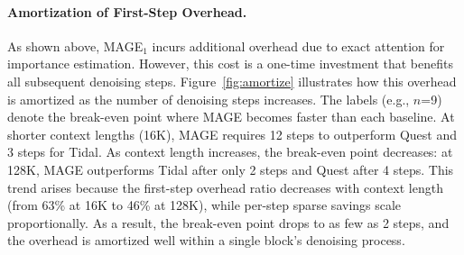 \paragraph{Amortization of First-Step Overhead.}
As shown above, MAGE$_1$ incurs additional overhead due to 
exact attention for importance estimation. However, this 
cost is a one-time investment that benefits all subsequent 
denoising steps. Figure~\ref{fig:amortize} illustrates how 
this overhead is amortized as the number of denoising steps 
increases. The labels (e.g., $n$=9) denote the break-even 
point where MAGE becomes faster than each baseline. At 
shorter context lengths (16K), MAGE requires 12 steps to 
outperform Quest and 3 steps for Tidal. As context length 
increases, the break-even point decreases: at 128K, MAGE 
outperforms Tidal after only 2 steps and Quest after 4 steps. 
This trend arises because the first-step overhead ratio 
decreases with context length (from 63\% at 16K to 46\% 
at 128K), while per-step sparse savings scale proportionally. 
As a result, the break-even point drops to as few as 2 steps, 
and the overhead is amortized well within a single block's 
denoising process.


